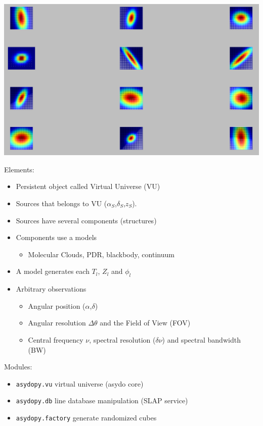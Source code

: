 \documentclass[slidestop,compress,mathserif,color,12pt]{beamer}
\begin{document}
\begin{frame}
\begin{minipage}{0.39\linewidth}
{\centerline{\includegraphics[width=0.97\linewidth]{comp_all.png}}}
\end{minipage}
\begin{minipage}{0.59\linewidth} 
Elements:
\begin{itemize}
\item Persistent object called Virtual Universe (VU)
\item Sources that belongs to VU ($\alpha_S$,$\delta_S$,$z_S$).
\item Sources have several components (structures)
\item Components use a models 
      \begin{itemize}
     \item \scriptsize Molecular Clouds, PDR, blackbody, continuum
		\end{itemize}
\item A model generates each $T_l$, $Z_l$ and $\phi_l$ 
\item Arbitrary observations
      \begin{itemize}
     \item \scriptsize Angular position ($\alpha$,$\delta$)
     \item Angular resolution $\Delta\theta$ and the Field of View (FOV)
     \item Central frequency $\nu$, spectral resolution ($\delta \nu$) 
		and spectral bandwidth (BW)
   \end{itemize}
\end{itemize}
Modules:
\begin{itemize}
\item \texttt{asydopy.vu} virtual universe (asydo core)
\item \texttt{asydopy.db} line database manipulation (SLAP service)
\item \texttt{asydopy.factory} generate randomized cubes
\end{itemize}
\end{minipage}
\end{frame}
\end{document}

